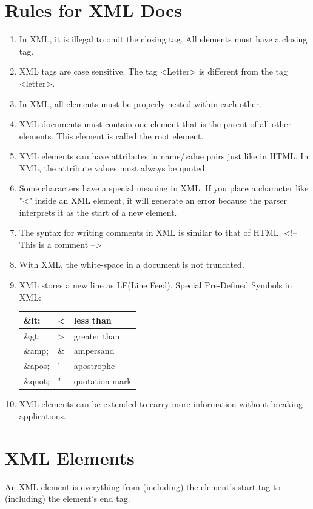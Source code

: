 \documentclass[a4paper,oneside]{book}
\begin{document}
\section{Rules for XML Docs}
\begin{enumerate}
\item In XML, it is illegal to omit the closing tag. All elements must have a closing tag.
\item XML tags are case sensitive. The tag <Letter> is different from the tag <letter>.
\item In XML, all elements must be properly nested within each other.
\item XML documents must contain one element that is the parent of all other elements. This element is called the root element.
\item XML elements can have attributes in name/value pairs just like in HTML.
In XML, the attribute values must always be quoted.
\item Some characters have a special meaning in XML.
If you place a character like "<" inside an XML element, it will generate an error because the parser interprets it as the start of a new element.
\item The syntax for writing comments in XML is similar to that of HTML.
<!-- This is a comment -->
\item With XML, the white-space in a document is not truncated.
\item XML stores a new line as LF(Line Feed).
Special Pre-Defined Symbols in XML:
\begin{tabular}[H]{|l|l|l|}
\hline
\&lt; &	< &	less than \\ \hline
\&gt; &	> &	greater than \\ \hline
\&amp; &  \&	&	ampersand \\ \hline
\&apos; & ' &	apostrophe \\ \hline
\&quot; & " &	quotation mark \\ \hline
\end{tabular}
\item XML elements can be extended to carry more information without breaking applications.
\end{enumerate}
\section{XML Elements}
An XML element is everything from (including) the element's start tag to (including) the element's end tag.
\end{document}
